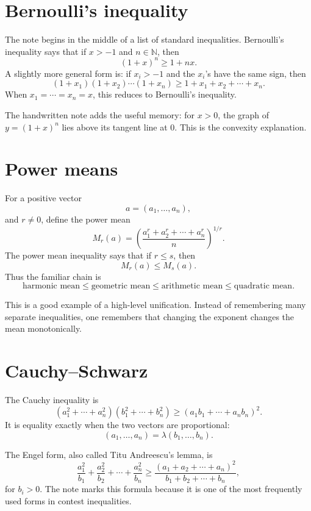 
\section{Bernoulli's inequality}

The note begins in the middle of a list of standard inequalities.  Bernoulli's inequality says that if \(x>-1\) and \(n\in\mathbb N\), then
\[
  (1+x)^n\ge 1+nx.
\]
A slightly more general form is: if \(x_i>-1\) and the \(x_i\)'s have the same sign, then
\[
  (1+x_1)(1+x_2)\cdots(1+x_n)
  \ge 1+x_1+x_2+\cdots+x_n.
\]
When \(x_1=\cdots=x_n=x\), this reduces to Bernoulli's inequality.

The handwritten note adds the useful memory: for \(x>0\), the graph of \(y=(1+x)^n\) lies above its tangent line at \(0\).  This is the convexity explanation.

\section{Power means}

For a positive vector
\[
  a=(a_1,\ldots,a_n),
\]
and \(r\neq0\), define the power mean
\[
  M_r(a)=\left(\frac{a_1^r+a_2^r+\cdots+a_n^r}{n}\right)^{1/r}.
\]
The power mean inequality says that if \(r\le s\), then
\[
  M_r(a)\le M_s(a).
\]
Thus the familiar chain is
\[
  \text{harmonic mean}\le\text{geometric mean}\le\text{arithmetic mean}\le\text{quadratic mean}.
\]

This is a good example of a high-level unification.  Instead of remembering many separate inequalities, one remembers that changing the exponent changes the mean monotonically.

\section{Cauchy--Schwarz}

The Cauchy inequality is
\[
  (a_1^2+\cdots+a_n^2)(b_1^2+\cdots+b_n^2)
  \ge (a_1b_1+\cdots+a_nb_n)^2.
\]
It is equality exactly when the two vectors are proportional:
\[
  (a_1,\ldots,a_n)=\lambda(b_1,\ldots,b_n).
\]

The Engel form, also called Titu Andreescu's lemma, is
\[
  \frac{a_1^2}{b_1}+\frac{a_2^2}{b_2}+\cdots+\frac{a_n^2}{b_n}
  \ge
  \frac{(a_1+a_2+\cdots+a_n)^2}{b_1+b_2+\cdots+b_n},
\]
for \(b_i>0\).  The note marks this formula because it is one of the most frequently used forms in contest inequalities.

